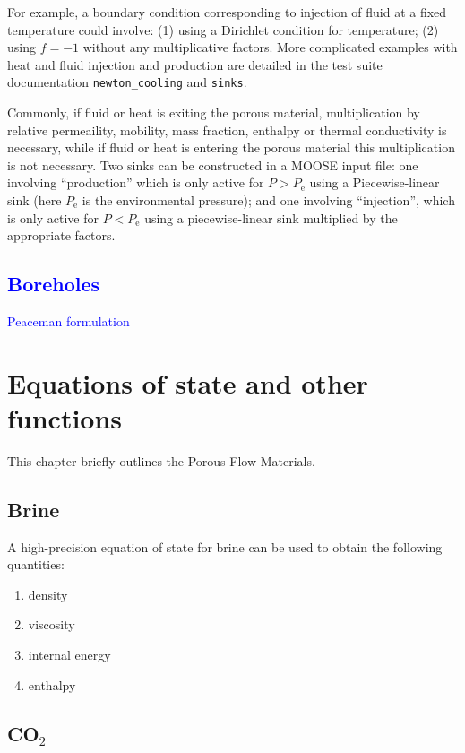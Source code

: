 \documentclass[12pt]{report}
\begin{document}
For example, a boundary condition corresponding to injection of fluid
at a fixed temperature could involve: (1) using a Dirichlet condition
for temperature; (2) using $f=-1$ without any multiplicative factors.
More complicated examples with heat and fluid injection and production
are detailed in the test suite documentation {\tt newton\_cooling} and
{\tt sinks}.

Commonly, if fluid or heat is exiting the porous
material, multiplication by relative permeaility, mobility, mass
fraction, enthalpy or thermal conductivity is necessary, while if
fluid or heat is entering the porous material this multiplication is
not necessary.  Two sinks can be constructed in a MOOSE input file: one involving
``production'' which is only active for $P>P_{\mathrm{e}}$ using a
Piecewise-linear sink (here $P_{\mathrm{e}}$ is the environmental
pressure); and one involving ``injection'', which is only active for
$P<P_{\mathrm{e}}$ using a piecewise-linear sink multiplied by the
appropriate factors.

\section{\textcolor{blue}{Boreholes}}

\textcolor{blue}{
Peaceman formulation
}

\chapter{Equations of state and other functions}
\label{eos}

This chapter briefly outlines the Porous Flow Materials.

\section{Brine}

A high-precision equation of state for brine can be used to
obtain the following quantities:
\begin{enumerate}
\item density
\item viscosity
\item internal energy
\item enthalpy
\end{enumerate}


\section{CO$_{2}$}
\end{document}

